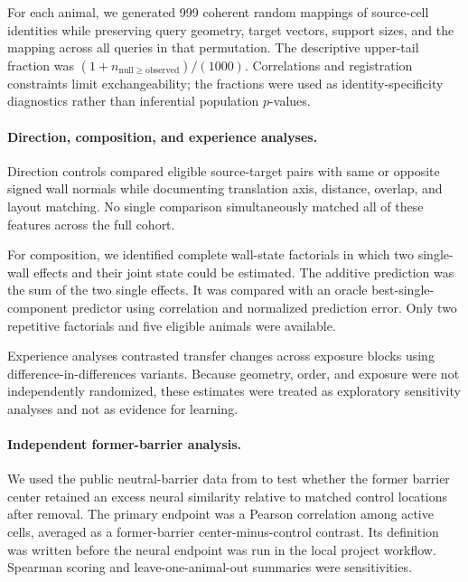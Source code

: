 \documentclass[10pt,twocolumn]{article}
\begin{document}
For each animal, we generated 999 coherent random mappings of source-cell
identities while preserving query geometry, target vectors, support sizes, and
the mapping across all queries in that permutation. The descriptive upper-tail
fraction was \((1+n_{\mathrm{null}\geq\mathrm{observed}})/(1000)\). Correlations
and registration constraints limit exchangeability; the fractions were used
as identity-specificity diagnostics rather than inferential population
\(p\)-values.

\paragraph{Direction, composition, and experience analyses.}

Direction controls compared eligible source-target pairs with same or opposite
signed wall normals while documenting translation axis, distance, overlap, and
layout matching. No single comparison simultaneously matched all of these
features across the full cohort.

For composition, we identified complete wall-state factorials in which two
single-wall effects and their joint state could be estimated. The additive
prediction was the sum of the two single effects. It was compared with an
oracle best-single-component predictor using correlation and normalized
prediction error. Only two repetitive factorials and five eligible animals
were available.

Experience analyses contrasted transfer changes across exposure blocks using
difference-in-differences variants. Because geometry, order, and exposure were
not independently randomized, these estimates were treated as exploratory
sensitivity analyses and not as evidence for learning.

\paragraph{Independent former-barrier analysis.}

We used the public neutral-barrier data from \citet{BlairEtAl2023}
to test whether the former barrier center retained an excess neural similarity
relative to matched control locations after removal. The primary endpoint was
a Pearson correlation among active cells, averaged as a former-barrier
center-minus-control contrast. Its definition was written before the neural
endpoint was run in the local project workflow. Spearman scoring and
leave-one-animal-out summaries were sensitivities.
\end{document}
